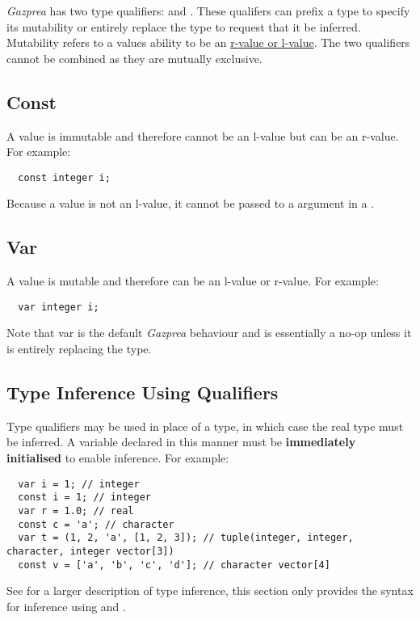 \documentclass[../gazprea.tex]{subfiles}
\begin{document}
\textit{Gazprea} has two type qualifiers:  and . These qualifers can prefix
a type to specify its mutability or entirely replace the type to request that it be inferred.
Mutability refers to a values ability to be an
\href{https://en.wikipedia.org/wiki/Value_(computer_science)\#lrvalue}{r-value or l-value}. The two
qualifiers cannot be combined as they are mutually exclusive.

\subsection{Const}
\label{ssec:typeQualifiers_const}
A  value is immutable and therefore cannot be an l-value but can be an r-value. For
example:
\begin{lstlisting}
  const integer i;
\end{lstlisting}

Because a  value is not an l-value, it cannot be passed to a  argument in a
.


\subsection{Var}
\label{ssec:typeQualifiers_var}
A  value is mutable and therefore can be an l-value or r-value. For example:
\begin{lstlisting}
  var integer i;
\end{lstlisting}

Note that var is the default \textit{Gazprea} behaviour and is essentially a no-op unless it is
entirely replacing the type.

\subsection{Type Inference Using Qualifiers}
\label{ssec:typeQualifiers_inf}
Type qualifiers may be used in place of a type, in which case the real type must be inferred. A
variable declared in this manner must be \textbf{immediately initialised} to enable inference. For
example:
\begin{lstlisting}
  var i = 1; // integer
  const i = 1; // integer
  var r = 1.0; // real
  const c = 'a'; // character
  var t = (1, 2, 'a', [1, 2, 3]); // tuple(integer, integer, character, integer vector[3])
  const v = ['a', 'b', 'c', 'd']; // character vector[4]
\end{lstlisting}


See  for a larger description of type inference, this section only
provides the syntax for inference using  and .
\end{document}
